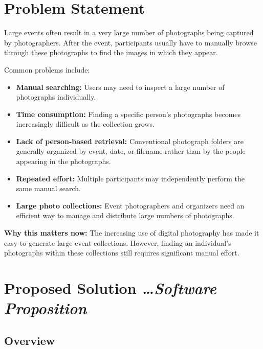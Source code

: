 \documentclass[11pt,a4paper]{article}
\newcommand{\BvrHint}[1]{%
  {\normalfont\normalsize\itshape\hfill #1}}
\begin{document}
\section{Problem Statement}

Large events often result in a very large number of photographs being
captured by photographers. After the event, participants usually have
to manually browse through these photographs to find the images in
which they appear.

Common problems include:

\begin{itemize}[leftmargin=0.7cm]

    \item \textbf{Manual searching:} Users may need to inspect a large
    number of photographs individually.

    \item \textbf{Time consumption:} Finding a specific person's
    photographs becomes increasingly difficult as the collection
    grows.

    \item \textbf{Lack of person-based retrieval:} Conventional
    photograph folders are generally organized by event, date, or
    filename rather than by the people appearing in the photographs.

    \item \textbf{Repeated effort:} Multiple participants may
    independently perform the same manual search.

    \item \textbf{Large photo collections:} Event photographers and
    organizers need an efficient way to manage and distribute large
    numbers of photographs.

\end{itemize}

\textbf{Why this matters now:} The increasing use of digital
photography has made it easy to generate large event collections.
However, finding an individual's photographs within these collections
still requires significant manual effort.

\section{Proposed Solution%
\BvrHint{\ldots Software Proposition}}

\subsection{Overview}
\end{document}
